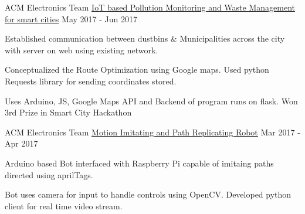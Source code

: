 \begin{cventries}
 
     \cventry
    {ACM Electronics Team}
    {\href{https://github.com/akhilesh-k/CityIoTary}{IoT based Pollution Monitoring and Waste Management for smart cities}}
    {}
    {May 2017 - Jun 2017}
    {
      \begin{cvitems}
        \item {Established communication between dustbins \& Municipalities across the city with server on web using existing network.}
        \item {Conceptualized the Route Optimization using Google maps. Used python Requests library for sending coordinates stored.}
        \item {Uses Arduino, JS, Google Maps API and Backend of program runs on flask. Won 3rd Prize in Smart City Hackathon}
      \end{cvitems}
    }
    \cventry
    {ACM Electronics Team}
    {\href{https://github.com/akhilesh-k/Prodigy_Bot}{Motion Imitating and Path Replicating Robot}}
    {}
    {Mar 2017 - Apr 2017}
    {
      \begin{cvitems}
        \item {Arduino based Bot interfaced with Raspberry Pi capable of imitaing paths directed using aprilTags.}
        \item {Bot uses camera for input to handle controls using OpenCV. Developed python client for real time video stream.}
      \end{cvitems}
    }
    

\end{cventries}
